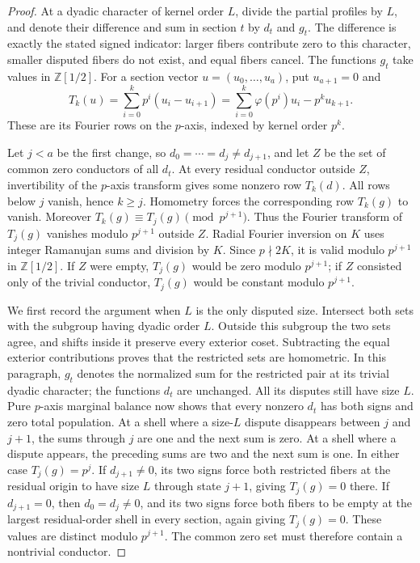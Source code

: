 \documentclass[11pt]{article}
\numberwithin{equation}{section}
\theoremstyle{definition}
\theoremstyle{remark}
\begin{document}
\begin{proof}
At a dyadic character of kernel order \(L\), divide the partial
profiles by \(L\), and denote their difference and sum in section
\(t\) by \(d_t\) and \(g_t\). The difference is exactly the stated
signed indicator: larger fibers contribute zero to this character,
smaller disputed fibers do not exist, and equal fibers cancel.
The functions \(g_t\) take values in \(\mathbb Z[1/2]\). For a section
vector \(u=(u_0,\ldots,u_a)\), put \(u_{a+1}=0\) and
\begin{equation}
T_k(u)=\sum_{i=0}^kp^i(u_i-u_{i+1})
      =\sum_{i=0}^k\varphi(p^i)u_i-p^ku_{k+1}.
\label{eq:primary-T}
\end{equation}
These are its Fourier rows on the \(p\)-axis, indexed by kernel
order \(p^k\).

Let \(j<a\) be the first change, so
\(d_0=\cdots=d_j\ne d_{j+1}\), and let \(Z\) be the set of
common zero conductors of all \(d_t\). At every residual conductor
outside \(Z\), invertibility of the \(p\)-axis transform gives some
nonzero row \(T_k(d)\). All rows below \(j\) vanish, hence \(k\ge j\).
Homometry forces the corresponding row \(T_k(g)\) to vanish. Moreover
\(T_k(g)\equiv T_j(g)\pmod{p^{j+1}}\). Thus the Fourier transform
of \(T_j(g)\) vanishes modulo \(p^{j+1}\) outside \(Z\).
Radial Fourier inversion on \(K\) uses integer Ramanujan sums and
division by \(K\). Since \(p\nmid 2K\), it is valid modulo
\(p^{j+1}\) in \(\mathbb Z[1/2]\). If \(Z\) were empty,
\(T_j(g)\) would be zero modulo \(p^{j+1}\); if \(Z\) consisted
only of the trivial conductor, \(T_j(g)\) would be constant modulo
\(p^{j+1}\).

We first record the argument when \(L\) is the only disputed size.
Intersect both sets with the subgroup having dyadic order \(L\).
Outside this subgroup the two sets agree, and shifts inside it
preserve every exterior coset. Subtracting the equal exterior
contributions proves that the restricted sets are homometric.
In this paragraph, \(g_t\) denotes the normalized sum for the
restricted pair at its trivial dyadic character; the functions \(d_t\)
are unchanged. All its disputes still have size \(L\). Pure \(p\)-axis marginal
balance now shows that every nonzero \(d_t\) has both signs and
zero total population. At a shell where a size-\(L\) dispute
disappears between \(j\) and \(j+1\), the sums through \(j\)
are one and the next sum is zero. At a shell where a dispute appears,
the preceding sums are two and the next sum is one. In either case
\(T_j(g)=p^j\). If \(d_{j+1}\ne0\), its two signs force both
restricted fibers at the residual origin to have size \(L\) through
state \(j+1\), giving \(T_j(g)=0\) there. If \(d_{j+1}=0\),
then \(d_0=d_j\ne0\), and its two signs force both fibers to be
empty at the largest residual-order shell in every section, again
giving \(T_j(g)=0\). These values are distinct modulo \(p^{j+1}\).
The common zero set must therefore contain a nontrivial conductor.


\end{proof}
\end{document}
